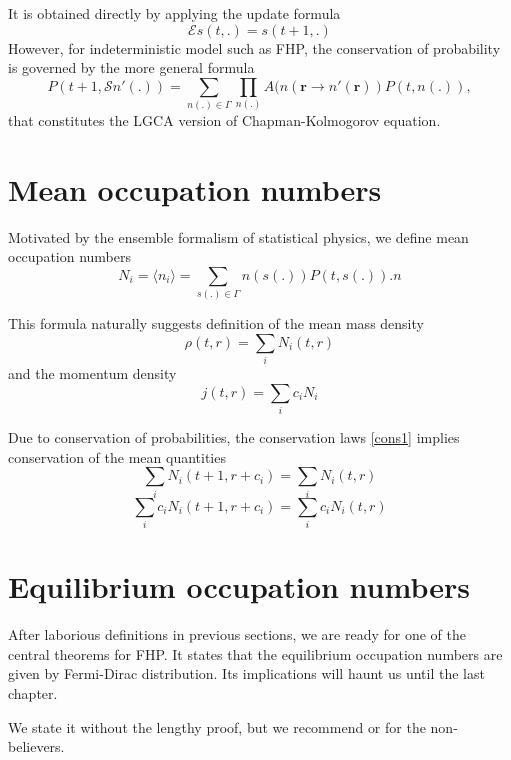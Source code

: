 It is obtained directly by applying the update formula
\begin{equation*}
\mathcal{E} s(t,.) = s(t+1,.)
\end{equation*}
However, for indeterministic model such as FHP, the conservation of probability is governed by the more general formula
\begin{equation}
P(t+1,\mathcal{S} n'(.)) = \sum_{n(.) \in \Gamma} \prod_{n(.)} A(n(\bm{r} \rightarrow n'(\bm{r})) P(t, n(.)),
\end{equation}
that constitutes the LGCA version of Chapman-Kolmogorov equation.

\section{Mean occupation numbers}
Motivated by the ensemble formalism of statistical physics, we define mean occupation numbers
\begin{equation*}
N_i = \langle n_i \rangle = \sum_{s(.) \in \Gamma} n(s(.)) P(t,s(.)) .n
\end{equation*}

This formula naturally suggests definition of the mean mass density
\begin{equation} \label{ddens}
\rho(t,r) = \sum_i N_i(t,r)
\end{equation}
and the momentum density
\begin{equation} \label{mmom}
j(t,r) = \sum_i c_i N_i
\end{equation}

Due to conservation of probabilities, the conservation laws \ref{cons1} implies conservation of the mean quantities
\begin{equation} \label{macro1}
\sum_i N_i(t+1,r+c_i) = \sum_i N_i(t,r) 
\end{equation}
\begin{equation} \label{macro2}
\sum_i c_i N_i(t+1,r+c_i) = \sum_i c_i N_i(t,r)
\end{equation}

\section{Equilibrium occupation numbers}
After laborious definitions in previous sections, we are ready for one of the central theorems for FHP. It states that the equilibrium occupation numbers are given by Fermi-Dirac distribution. Its implications will haunt us until the last chapter.

We state it without the lengthy proof, but we recommend \cite{wolf} or \cite{frisch} for the non-believers.

